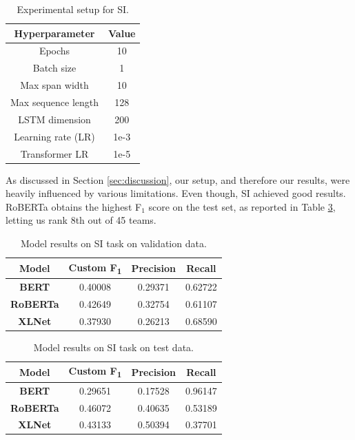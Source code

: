 \documentclass[11pt]{article}
\newcommand{\pol}[1]{{\fontfamily{pcr}\selectfont#1}}
\begin{document}
\begin{table}[h]
\centering
  \begin{tabular}{c c}
    \hline
    \textbf{Hyperparameter} & \textbf{Value} \\
    \hline
    Epochs & 10 \\
    Batch size & 1 \\
    Max span width & 10 \\
    Max sequence length & 128 \\
    \pol{LSTM} dimension & 200 \\
    Learning rate (LR) & 1e-3 \\
    Transformer LR & 1e-5 \\
    \hline
  \end{tabular}
  \caption{Experimental setup for \pol{SI}.}
  \label{table:si-params}
\end{table}

As discussed in Section \ref{sec:discussion}, our setup, and therefore our results, were heavily influenced by various limitations. Even though, \pol{SI} achieved good results. \pol{RoBERTa} obtains the highest F$_1$ score on the test set, as reported in Table \ref{table:si-test-results}, letting us rank 8th out of 45 teams. 

\begin{table}[h]
\centering
  \begin{tabular}{|c|c c c|}
    \hline
    \textbf{Model} & \textbf{Custom F\textsubscript{1}} & \textbf{Precision} & \textbf{Recall} \\
    \hline
    \pol{\textbf{BERT}} & 0.40008 & 0.29371 & 0.62722 \\
    \pol{\textbf{RoBERTa}} & 0.42649 & 0.32754 & 0.61107 \\ 
    \pol{\textbf{XLNet}} & 0.37930 & 0.26213 & 0.68590 \\
    \hline
  \end{tabular}
  \caption{Model results on \pol{SI} task on validation data.}
    \label{table:si-val-results}
\end{table}

\begin{table}[h]
\centering
  \begin{tabular}{|c|c c c|}
    \hline
    \textbf{Model} & \textbf{Custom F\textsubscript{1}} & \textbf{Precision} & \textbf{Recall} \\
    \hline
     \textbf{\pol{BERT}}  & 0.29651 & 0.17528 & 0.96147\\ 
    \textbf{\pol{RoBERTa}}  & 0.46072 & 0.40635 & 0.53189 \\
    \textbf{\pol{XLNet}}  & 0.43133 & 0.50394 & 0.37701\\
    \hline
  \end{tabular}
  \caption{Model results on \pol{SI} task on test data.}
    \label{table:si-test-results}
\end{table}
\end{document}
